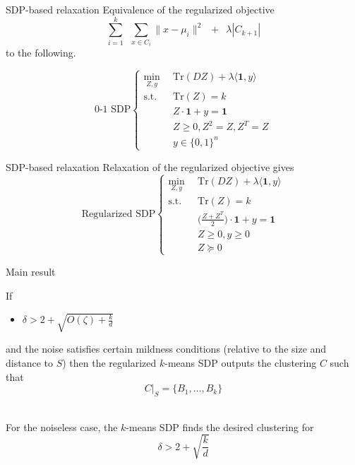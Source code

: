 \documentclass{beamer}
\newcommand{\mb}{\mathbf}
\newcommand{\tr}{\text{Tr}}
\begin{document}
\begin{frame}{SDP-based relaxation}
	Equivalence of the regularized objective 
	$$\sum_{i =1}^k\enspace\sum_{x \in C_i} \|x - \mu_i\|^2 \enspace+\enspace \lambda |C_{k+1}|$$ to the following.
	
	$$	
	\text{0-1 SDP}
	\begin{cases}
		\min_{Z, y} \enspace &\tr(DZ) + \lambda \langle \mb 1, y\rangle\\
		\text{s.t. } \enspace &\tr(Z) = k\\
		& Z\cdot \mb 1 + y = \mb 1\\	
		&Z\ge 0, Z^2 = Z, Z^T = Z \\
		& y \in \{0, 1\}^n
	\end{cases}	
	$$
\end{frame}

\begin{frame}{SDP-based relaxation}
	Relaxation of the regularized objective gives
	$$	
	\text{Regularized SDP}
	\begin{cases}
		\min_{Z, y} \enspace &\tr(DZ) + \lambda \langle \mb 1, y\rangle\\
        \text{s.t. } \enspace &\tr(Z) = k\\
		& \Big(\frac{Z+Z^T}{2}\Big)\cdot \mb 1 + y = \mb 1\\		
		&Z \ge 0, y \ge 0\\
		& Z \succeq 0
	\end{cases}
	$$
\end{frame}

\begin{frame}{Main result}
	\begin{theorem}
	 If  
	\begin{itemize}
	  \item $\delta > 2 + \sqrt{ O(\zeta) + \frac{k}{d}}$ 
	\end{itemize}
	and the noise satisfies certain mildness conditions (relative to the size and distance to $S$) then the regularized $k$-means SDP outputs the clustering $C$ such that
	$$C|_{S} = \{B_1, \ldots, B_k\}$$
	\end{theorem}
	
	\\
	For the noiseless case, the $k$-means SDP finds the desired clustering for $$\delta > 2 + \sqrt{\frac{k}{d}}$$
\end{frame}
\end{document}
